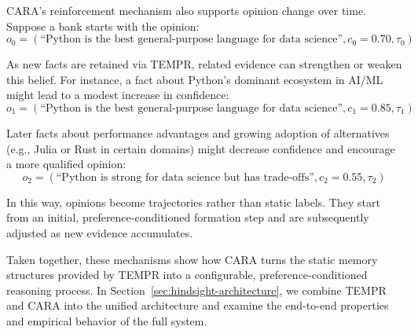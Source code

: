 CARA's reinforcement mechanism also supports opinion change over time. Suppose a bank starts with the opinion:
\begin{equation}
o_0 = (\text{``Python is the best general-purpose language for data science''}, c_0 = 0.70, \tau_0)
\end{equation}

As new facts are retained via TEMPR, related evidence can strengthen or weaken this belief. For instance, a fact about Python's dominant ecosystem in AI/ML might lead to a modest increase in confidence:
\begin{equation}
o_1 = (\text{``Python is the best general-purpose language for data science''}, c_1 = 0.85, \tau_1)
\end{equation}

Later facts about performance advantages and growing adoption of alternatives (e.g., Julia or Rust in certain domains) might decrease confidence and encourage a more qualified opinion:
\begin{equation}
o_2 = (\text{``Python is strong for data science but has trade-offs''}, c_2 = 0.55, \tau_2)
\end{equation}

In this way, opinions become trajectories rather than static labels. They start from an initial, preference-conditioned formation step and are subsequently adjusted as new evidence accumulates.

Taken together, these mechanisms show how CARA turns the static memory structures provided by TEMPR into a configurable, preference-conditioned reasoning process. In Section~\ref{sec:hindsight-architecture}, we combine TEMPR and CARA into the unified \our architecture and examine the end-to-end properties and empirical behavior of the full system.
